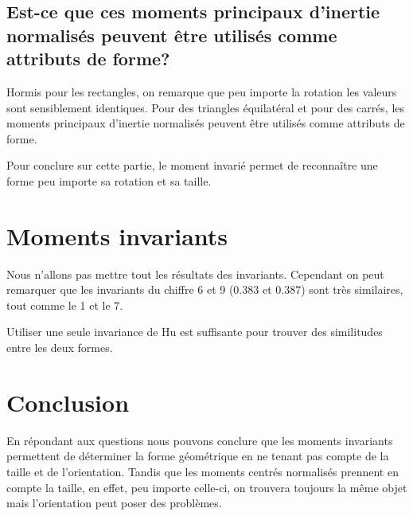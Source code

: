\documentclass[a4paper,12pt]{report}
\begin{document}
\subsection*{Est-ce que ces moments principaux d'inertie normalisés peuvent être utilisés comme attributs de forme?}

Hormis pour les rectangles, on remarque que peu importe la rotation les valeurs sont sensiblement identiques. Pour des triangles équilatéral et pour des carrés, les moments principaux d'inertie normalisés peuvent être utilisés comme attributs de forme.

Pour conclure sur cette partie, le moment invarié permet de reconnaître une forme peu importe sa rotation et sa taille.


\section*{Moments invariants}

Nous n'allons pas mettre tout les résultats des invariants. Cependant on peut remarquer que les invariants du chiffre 6 et 9 (0.383 et 0.387) sont très similaires, tout comme le 1 et le 7. 

Utiliser une seule invariance de Hu est suffisante pour trouver des similitudes entre les deux formes. 


\section*{Conclusion}

En répondant aux questions nous pouvons conclure que les moments invariants permettent de déterminer la forme géométrique en ne tenant pas compte de la taille et de l'orientation.
Tandis que les moments centrés normalisés prennent en compte la taille, en effet, peu importe celle-ci, on trouvera toujours la même objet mais l'orientation peut poser des problèmes.
\end{document}
